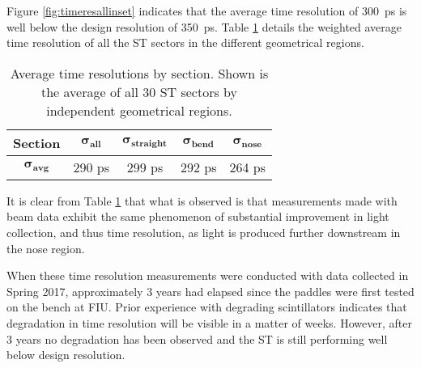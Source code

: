 Figure \ref{fig:timeresallinset} indicates that the average time resolution of 300~ps is well below the design resolution of 350~ps.  Table \ref{tab:time_res_section} details the weighted average time resolution of all the ST sectors in the different geometrical regions.
\begin{table}[ch]
	\centering
	\begin{tabular}{|c|c|c|c|c|}
		\hline  \textbf{Section} & $\mathbf{\sigma_{all}}$ & $\mathbf{\sigma_{straight}}$ & $\mathbf{\sigma_{bend}}$ & $\mathbf{\sigma_{nose}}$ \\ 
		\hline $\mathbf{\sigma_{avg}}$ & 290 ps & 299 ps & 292 ps & 264 ps \\ 
		\hline 
	\end{tabular}
	\caption[Average time resolutions by section]{Average time resolutions by section. Shown is the average of all 30 ST sectors by independent geometrical regions.}
	\label{tab:time_res_section}
\end{table}
It is clear from Table \ref{tab:time_res_section} that what is observed is that measurements made with beam data exhibit the same phenomenon of substantial improvement in light collection, and thus time resolution, as light is produced further downstream in the nose region.

When these time resolution measurements were conducted with data collected in Spring 2017, approximately 3 years had elapsed since the paddles were first tested on the bench at FIU.  Prior experience with degrading scintillators indicates that degradation in time resolution will be visible in a matter of weeks.  However, after 3 years no degradation has been observed and the ST is still performing well below design resolution.